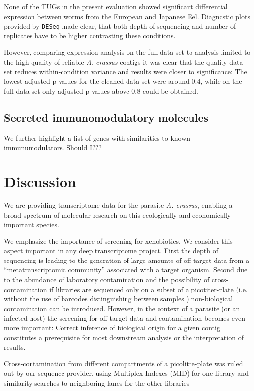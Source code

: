 \documentclass[10pt]{bmc_article}
\newenvironment{bmcformat}{\begin{raggedright}\baselineskip20pt\sloppy\setboolean{publ}{false}}{\end{raggedright}\baselineskip20pt\sloppy}
\begin{document}
\begin{bmcformat}
None of the TUGs in the present evaluation showed significant
differential expression between worms from the European and Japanese
Eel. Diagnostic plots provided by \texttt{DESeq} made clear, that both
depth of sequencing and number of replicates have to be higher
contrasting these conditions.

However, comparing expression-analysis on the full data-set to analysis
limited to the high quality of reliable \textit{A. crassus}-contigs it
was clear that the quality-data-set reduces within-condition variance
and results were closer to significance: The lowest adjusted p-values
for the cleaned data-set were around 0.4, while on the full data-set
only adjusted p-values above 0.8 could be obtained.

\subsection*{Secreted immunomodulatory molecules}

We further highlight a list of genes with similarities to known
immunumodulators. Should I???


\section*{Discussion}

We are providing transcriptome-data for the parasite
\textit{A. crassus}, enabling a broad spectrum of molecular research on
this ecologically and economically important species.

We emphasize the importance of screening for xenobiotics. We consider
this aspect important in any deep transcriptome project. First the
depth of sequencing is leading to the generation of large amounts of
off-target data from a ``metatranscriptomic community'' associated with a
target organism. Second due to the abundance of laboratory
contamination and the possibility of cross-contamination if libraries
are sequenced only on a subset of a picotiter-plate (i.e. without the
use of barcodes distinguishing between samples \cite{pmid20137071})
non-biological contamination can be introduced. 
However, in the context of a parasite (or an infected host) the
screening for off-target data and contamination becomes even more
important: Correct inference of biological origin for a given contig
constitutes a prerequisite for most downstream analysis or the
interpretation of results.

Cross-contamination from different compartments of a picolitre-plate
was ruled out by our sequence provider, using Multiplex Indexes (MID)
for one library and similarity searches to neighboring lanes for the
other libraries.


\end{bmcformat}
\end{document}
